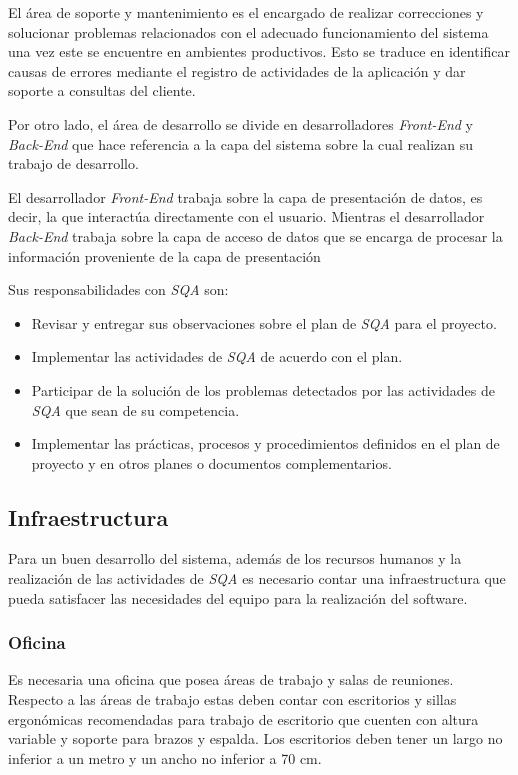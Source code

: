 El área de soporte y mantenimiento es el encargado de realizar correcciones y solucionar problemas relacionados con el adecuado funcionamiento del sistema una vez este se encuentre en ambientes productivos. Esto se traduce en identificar causas de errores mediante el registro de actividades de la aplicación y dar soporte a consultas del cliente.

Por otro lado, el área de desarrollo se divide en desarrolladores \textit{Front-End} y \textit{Back-End} que hace referencia a la capa del sistema sobre la cual realizan su trabajo de desarrollo. 

El desarrollador \textit{Front-End} trabaja sobre la capa de presentación de datos, es decir, la que interactúa directamente con el usuario. Mientras el desarrollador \textit{Back-End} trabaja sobre la capa de acceso de datos que se encarga de procesar la información proveniente de la capa de presentación

Sus responsabilidades con \textit{SQA} son: 

	\begin{itemize}
		\item
		Revisar y entregar sus observaciones sobre el plan de \textit{SQA} para el proyecto.
		\item
		Implementar las actividades de \textit{SQA} de acuerdo con el plan.
		\item
		Participar de la solución de los problemas detectados por las actividades de \textit{SQA} que sean de su competencia.
		\item
		Implementar las prácticas, procesos y procedimientos definidos en el plan de proyecto y en otros planes o documentos complementarios.
	\end{itemize}

\subsection{Infraestructura}
Para un buen desarrollo del sistema, además de los recursos humanos y la realización de las actividades de \textit{SQA} es necesario contar una infraestructura que pueda satisfacer las necesidades del equipo para la realización del software. 

\subsubsection{Oficina}

Es necesaria una oficina que posea áreas de trabajo y salas de reuniones. Respecto a las áreas de trabajo estas deben contar con escritorios y sillas ergonómicas recomendadas para trabajo de escritorio que cuenten con altura variable y soporte para brazos y espalda. Los escritorios deben tener un largo no inferior a un metro y un ancho no inferior a 70 cm. 

